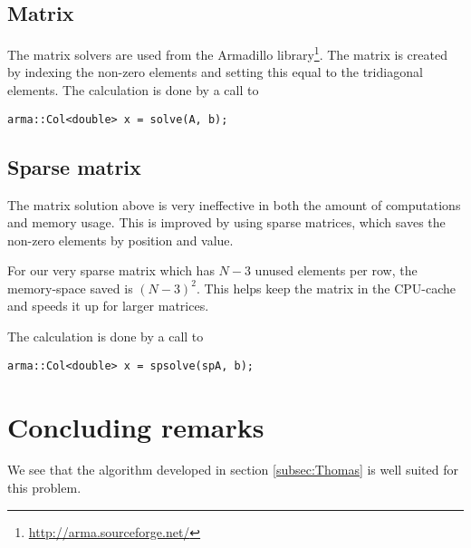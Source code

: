 \documentclass[11pt,a4paper,english,final]{article}
\numberwithin{equation}{section}
\begin{document}
\subsection{Matrix}

The matrix solvers are used from the Armadillo 
library\footnote{\url{http://arma.sourceforge.net/}}. The matrix is
created by indexing the non-zero elements and setting this equal to the 
tridiagonal elements. The calculation is done by a call to 
\begin{lstlisting}
arma::Col<double> x = solve(A, b);
\end{lstlisting}



\subsection{Sparse matrix}

The matrix solution above is very ineffective in both the amount
of computations and memory usage. This is improved by using sparse 
matrices, which saves the non-zero elements by position and value.

For our very sparse matrix which has $N-3$ unused elements per row, the
memory-space saved is $(N-3)^2$. This helps keep the matrix in the 
CPU-cache and speeds it up for larger matrices.

The calculation is done by a call to
\begin{lstlisting}
arma::Col<double> x = spsolve(spA, b);
\end{lstlisting}



\section{Concluding remarks}


We see that the algorithm developed in section \ref{subsec:Thomas} is 
well suited for this problem.
\end{document}
